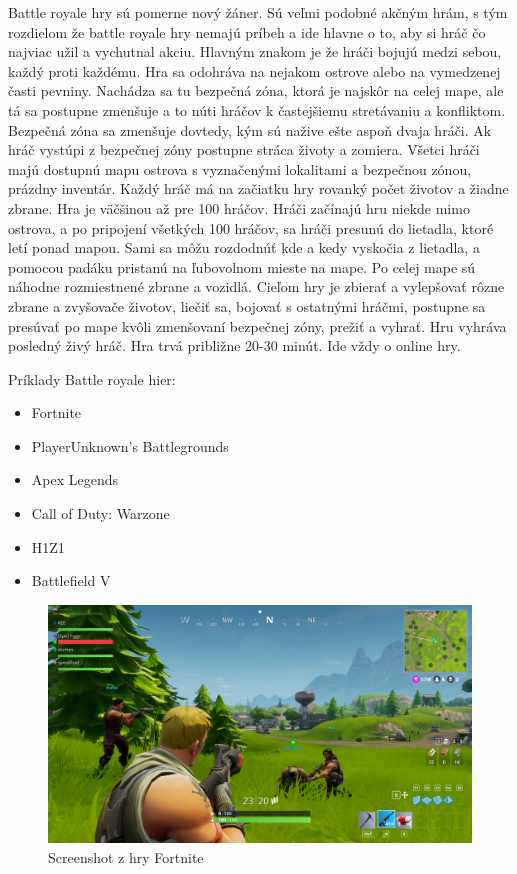 \documentclass[10pt,twoside,slovak,a4paper]{article}
\begin{document}
Battle royale hry sú pomerne nový žáner. Sú veľmi podobné akčným hrám, s tým rozdielom že battle royale hry nemajú príbeh a ide hlavne o to, aby si hráč čo najviac užil a vychutnal akciu. Hlavným znakom je že hráči bojujú medzi sebou, každý proti každému. Hra sa odohráva na nejakom ostrove alebo na vymedzenej časti pevniny. Nachádza sa tu bezpečná zóna, ktorá je najskôr na celej mape, ale tá sa postupne zmenšuje a to núti hráčov k častejšiemu stretávaniu a konfliktom. Bezpečná zóna sa zmenšuje dovtedy, kým sú nažive ešte aspoň dvaja hráči. Ak hráč vystúpi z bezpečnej zóny postupne stráca životy a zomiera. Všetci hráči majú dostupnú mapu ostrova s vyznačenými lokalitami a bezpečnou zónou, prázdny inventár. Každý hráč má na začiatku hry rovanký počet životov a žiadne zbrane. Hra je väčšinou až pre 100 hráčov. Hráči začínajú hru niekde mimo ostrova, a po pripojení všetkých 100 hráčov, sa hráči presunú do lietadla, ktoré letí ponad mapou. Sami sa môžu rozdodnúť kde a kedy vyskočia z lietadla, a pomocou padáku pristanú na ľubovolnom mieste na mape. Po celej mape sú náhodne rozmiestnené zbrane a vozidlá. Cieľom hry je zbierať a vylepšovať rôzne zbrane a zvyšovače životov, liečiť sa, bojovať s ostatnými hráčmi, postupne sa presúvať po mape kvôli zmenšovaní bezpečnej zóny, prežiť a vyhrať. Hru vyhráva posledný živý hráč. Hra trvá približne 20-30 minút. Ide vždy o online hry.

Príklady Battle royale hier:
\begin{itemize}
\item Fortnite
\item PlayerUnknown's Battlegrounds
\item Apex Legends
\item Call of Duty: Warzone
\item H1Z1
\item Battlefield V
\end{itemize}

\begin{figure}[tbh]
\centering
\includegraphics[scale=0.15]{fortnite.jpg}
\caption{Screenshot z hry Fortnite}
\label{f:fortnite}
\end{figure}
\end{document}
